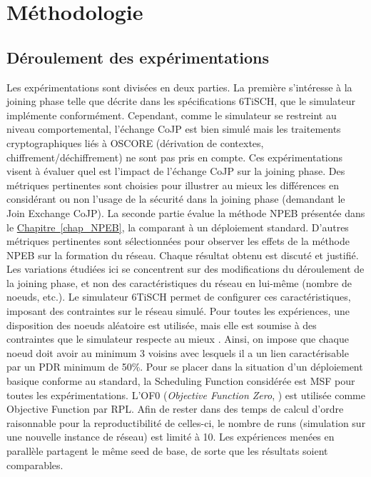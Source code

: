 \documentclass[]{report}
\newcommand{\wordlink}[2]{\hyperref[#2]{#1~\ref{#2}}}
\begin{document}
\section{Méthodologie}

\subsection{Déroulement des expérimentations}

Les expérimentations sont divisées en deux parties. La première s'intéresse à la joining phase telle que décrite dans les spécifications 6TiSCH, que le simulateur implémente conformément. Cependant, comme le simulateur se restreint au niveau comportemental, l'échange CoJP est bien simulé mais les traitements cryptographiques liés à OSCORE (dérivation de contextes, chiffrement/déchiffrement) ne sont pas pris en compte. Ces expérimentations visent à évaluer quel est l'impact de l'échange CoJP sur la joining phase. Des métriques pertinentes sont choisies pour illustrer au mieux les différences en considérant ou non l'usage de la sécurité dans la joining phase (demandant le Join Exchange CoJP). La seconde partie évalue la méthode NPEB présentée dans le \wordlink{Chapitre}{chap_NPEB}, la comparant à un déploiement standard. D'autres métriques pertinentes sont sélectionnées pour observer les effets de la méthode NPEB sur la formation du réseau. Chaque résultat obtenu est discuté et justifié.\\

Les variations étudiées ici se concentrent sur des modifications du déroulement de la joining phase, et non des caractéristiques du réseau en lui-même (nombre de noeuds, etc.). Le simulateur 6TiSCH permet de configurer ces caractéristiques, imposant des contraintes sur le réseau simulé. Pour toutes les expériences, une disposition des noeuds aléatoire est utilisée, mais elle est soumise à des contraintes que le simulateur respecte au mieux \cite{simulating-6TiSCH}. Ainsi, on impose que chaque noeud doit avoir au minimum 3 voisins avec lesquels il a un lien caractérisable par un PDR minimum de 50\%. Pour se placer dans la situation d'un déploiement basique conforme au standard, la Scheduling Function considérée est MSF pour toutes les expérimentations. L'OF0 (\textit{Objective Function Zero}, \cite{rfc6552}) est utilisée comme Objective Function par RPL. Afin de rester dans des temps de calcul d'ordre raisonnable pour la reproductibilité de celles-ci, le nombre de runs (simulation sur une nouvelle instance de réseau) est limité à 10. Les expériences menées en parallèle partagent le même seed de base, de sorte que les résultats soient comparables.\\
\end{document}
